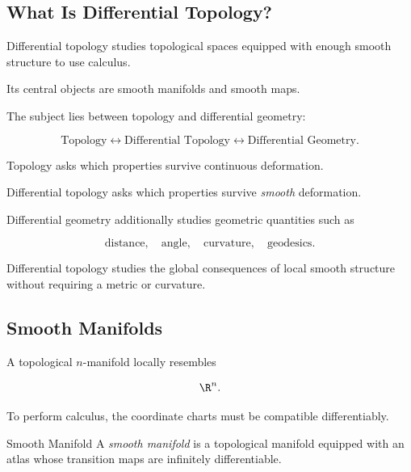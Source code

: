 \subsection{What Is Differential Topology?}
\label{subsec:what-is-differential-topology}

Differential topology studies topological spaces equipped with enough
smooth structure to use calculus.

Its central objects are smooth manifolds and smooth maps.

The subject lies between topology and differential geometry:

\[
\boxed{
\text{Topology}
\longleftrightarrow
\text{Differential Topology}
\longleftrightarrow
\text{Differential Geometry}.
}
\]

Topology asks which properties survive continuous deformation.

Differential topology asks which properties survive \emph{smooth}
deformation.

Differential geometry additionally studies geometric quantities such as

\[
\boxed{
\text{distance},
\quad
\text{angle},
\quad
\text{curvature},
\quad
\text{geodesics}.
}
\]

\begin{conceptbox}
Differential topology studies the global consequences of local smooth
structure without requiring a metric or curvature.
\end{conceptbox}

\subsection{Smooth Manifolds}
\label{subsec:differential-topology-smooth-manifolds}

A topological \(n\)-manifold locally resembles

\[
\R^n.
\]

To perform calculus, the coordinate charts must be compatible
differentiably.

\begin{definitionbox}{Smooth Manifold}
A \emph{smooth manifold} is a topological manifold equipped with an atlas
whose transition maps are infinitely differentiable.
\end{definitionbox}

